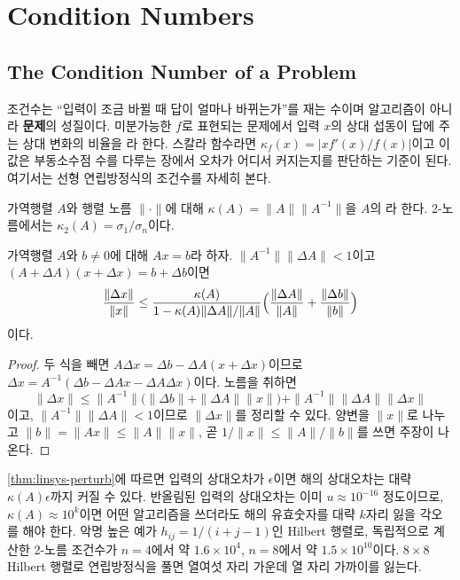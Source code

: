 \section{Condition Numbers}
\label{sec:condition}

\subsection{The Condition Number of a Problem}

조건수는 ``입력이 조금 바뀔 때 답이 얼마나 바뀌는가''를 재는 수이며 알고리즘이 아니라 \textbf{문제}의 성질이다. 미분가능한 $f$로 표현되는 문제에서 입력 $x$의 상대 섭동이 답에 주는 상대 변화의 비율을 라 한다. 스칼라 함수라면 $\kappa_f(x)=|xf'(x)/f(x)|$이고 이 값은 부동소수점 수를 다루는 장에서 오차가 어디서 커지는지를 판단하는 기준이 된다. 여기서는 선형 연립방정식의 조건수를 자세히 본다.

\begin{definition}
\label{def:cond}
가역행렬 $A$와 행렬 노름 $\|\cdot\|$에 대해 $\kappa(A)=\|A\|\|A^{-1}\|$을 $A$의 라 한다. 2-노름에서는 $\kappa_2(A)=\sigma_1/\sigma_n$이다.
\end{definition}

\begin{theorem}
\label{thm:linsys-perturb}
가역행렬 $A$와 $b\ne0$에 대해 $Ax=b$라 하자. $\|A^{-1}\|\|\Delta A\|<1$이고 $(A+\Delta A)(x+\Delta x)=b+\Delta b$이면
\[
\frac{\|\Delta x\|}{\|x\|}\le\frac{\kappa(A)}{1-\kappa(A)\|\Delta A\|/\|A\|}\Bigl(\frac{\|\Delta A\|}{\|A\|}+\frac{\|\Delta b\|}{\|b\|}\Bigr)
\]
이다.
\end{theorem}

\begin{proof}
두 식을 빼면 $A\Delta x=\Delta b-\Delta A(x+\Delta x)$이므로 $\Delta x=A^{-1}(\Delta b-\Delta Ax-\Delta A\Delta x)$이다. 노름을 취하면
\[
\|\Delta x\|\le\|A^{-1}\|\bigl(\|\Delta b\|+\|\Delta A\|\|x\|\bigr)+\|A^{-1}\|\|\Delta A\|\|\Delta x\|
\]
이고, $\|A^{-1}\|\|\Delta A\|<1$이므로 $\|\Delta x\|$를 정리할 수 있다. 양변을 $\|x\|$로 나누고 $\|b\|=\|Ax\|\le\|A\|\|x\|$, 곧 $1/\|x\|\le\|A\|/\|b\|$를 쓰면 주장이 나온다.
\end{proof}

\cref{thm:linsys-perturb}에 따르면 입력의 상대오차가 $\epsilon$이면 해의 상대오차는 대략 $\kappa(A)\epsilon$까지 커질 수 있다. 반올림된 입력의 상대오차는 이미 $u\approx10^{-16}$ 정도이므로, $\kappa(A)\approx10^{k}$이면 어떤 알고리즘을 쓰더라도 해의 유효숫자를 대략 $k$자리 잃을 각오를 해야 한다. 악명 높은 예가 $h_{ij}=1/(i+j-1)$인 Hilbert 행렬로, 독립적으로 계산한 2-노름 조건수가 $n=4$에서 약 $1.6\times10^4$, $n=8$에서 약 $1.5\times10^{10}$이다. $8\times8$ Hilbert 행렬로 연립방정식을 풀면 열여섯 자리 가운데 열 자리 가까이를 잃는다.

